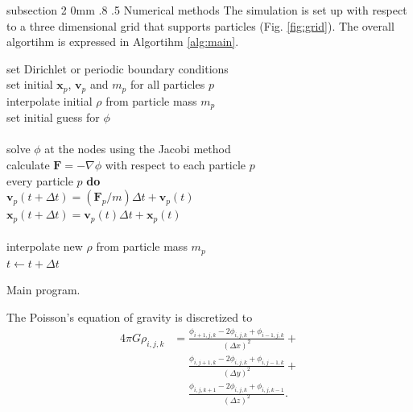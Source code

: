 \documentclass[notitlepage, 12pt]{article}
\makeatletter
\renewcommand{\subsection}{\@startsection    %
        {subsection}
        {2}
        {0mm}
        {.8\baselineskip}
        {.5\baselineskip}
        {\bfseries\normalsize}}
\makeatother
\begin{document}
\subsection{Numerical methods}\label{ssec:numerical}
The simulation is set up with respect to a three dimensional grid that supports particles (Fig. \ref{fig:grid}).
The overall algortihm is expressed in Algortihm \ref{alg:main}.
\begin{algorithm}[H]
\hspace{0.1\textwidth}\parbox{.8\textwidth}{
\-\hspace{0ex}set Dirichlet or periodic boundary conditions\\
\-\hspace{0ex}set initial $\mathbf{x}_p$, $\mathbf{v}_p$ and $m_p$ for all particles $p$\\
\-\hspace{0ex}interpolate initial $\rho$ from particle mass $m_p$\\
\-\hspace{0ex}set initial guess for $\phi$\\
\-\hspace{0ex}{\bf loop}\\
\-\hspace{4ex}solve $\phi$ at the nodes using the Jacobi method\\
\-\hspace{4ex}calculate $\mathbf{F}=-\nabla \phi$ with respect to each particle $p$\\
\-\hspace{4ex}{\bf for} every particle $p$ {\bf do}\\
\-\hspace{8ex}$\mathbf{v}_p(t+\Delta t) = (\mathbf{F}_p/m)\Delta t + \mathbf{v}_p(t)$\\
\-\hspace{8ex}$\mathbf{x}_p(t+\Delta t) = \mathbf{v}_p(t)\Delta t + \mathbf{x}_p(t)$\\
\-\hspace{4ex}{\bf end for}\\
\-\hspace{4ex}interpolate new $\rho$ from particle mass $m_p$\\
\-\hspace{4ex}$t\leftarrow t+\Delta t$\\
\-\hspace{0ex}{\bf end loop}}
\caption{Main program.}
\label{alg:main}
\end{algorithm}

The Poisson's equation of gravity is discretized to 
\begin{equation} \label{eq:discretized_poisson}
\begin{aligned}
4\pi G\rho_{i,j,k} &= \frac{\phi_{i+1,j,k}-2\phi_{i,j,k}+\phi_{i-1,j,k}}{(\Delta x)^2}+\\
& \phantom{{}={}} \frac{\phi_{i,j+1,k}-2\phi_{i,j,k}+\phi_{i,j-1,k}}{(\Delta y)^2}+\\
& \phantom{{}={}} \frac{\phi_{i,j,k+1}-2\phi_{i,j,k}+\phi_{i,j,k-1}}{(\Delta z)^2}.
\end{aligned}
\end{equation}
\end{document}
